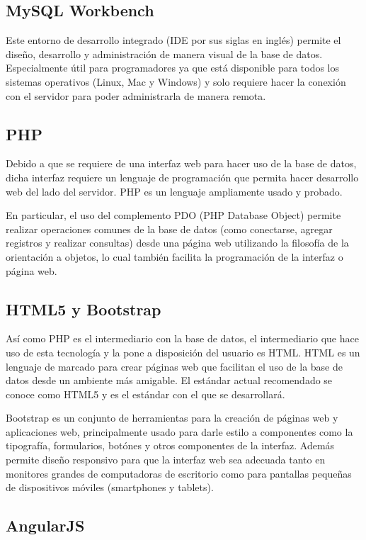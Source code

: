 \documentclass[10pt,letterpaper]{article}
\begin{document}
\subsection{MySQL Workbench}
Este entorno de desarrollo integrado (IDE por sus siglas en inglés) permite el diseño, desarrollo y administración de manera visual de la base de datos. Especialmente útil para programadores ya que está disponible para todos los sistemas operativos (Linux, Mac y Windows) y solo requiere hacer la conexión con el servidor para poder administrarla de manera remota.

\subsection{PHP}
Debido a que se requiere de una interfaz web para hacer uso de la base de datos, dicha interfaz requiere un lenguaje de programación que permita hacer desarrollo web del lado del servidor. PHP es un lenguaje ampliamente usado y probado.

En particular, el uso del complemento PDO (PHP Database Object) permite realizar operaciones comunes de la base de datos (como conectarse, agregar registros y realizar consultas) desde una página web utilizando la filosofía de la orientación a objetos, lo cual también facilita la programación de la interfaz o página web.

\subsection{HTML5 y Bootstrap}
Así como PHP es el intermediario con la base de datos, el intermediario que hace uso de esta tecnología y la pone a disposición del usuario es HTML. HTML es un lenguaje de marcado para crear páginas web que facilitan el uso de la base de datos desde un ambiente más amigable. El estándar actual recomendado se conoce como HTML5 y es el estándar con el que se desarrollará.

Bootstrap es un conjunto de herramientas para la creación de páginas web y aplicaciones web, principalmente usado para darle estilo a componentes como la tipografía, formularios, botónes y otros componentes de la interfaz. Además permite diseño responsivo para que la interfaz web sea adecuada tanto en monitores grandes de computadoras de escritorio como para pantallas pequeñas de dispositivos móviles (smartphones y tablets).

\subsection{AngularJS}
\end{document}
